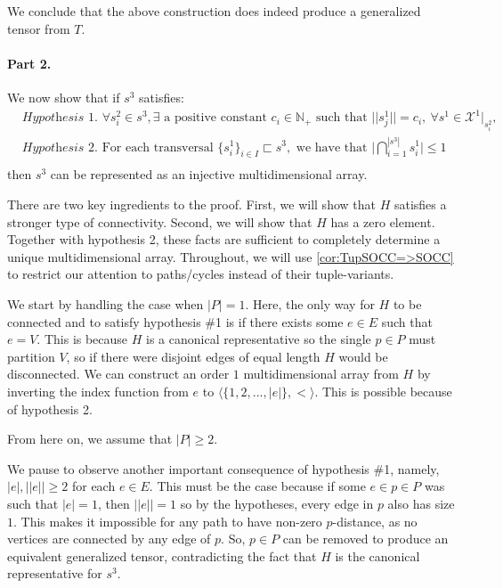 \documentclass{article}
\theoremstyle{plain}
\theoremstyle{definition}
\theoremstyle{remark}
\newcommand{\cX}{\mathcal{X}}
\let\oldparagraph\paragraph
\renewcommand{\paragraph}[1]{%
	\vspace{-0.5em}%
	\oldparagraph{#1}%
}
\begin{document}
	We conclude that the above construction does indeed produce a generalized tensor from $T$.
	
	\paragraph{Part 2.} We now show that if $s^3$ satisfies:
	\begin{equation*}
		\begin{aligned}
			&\textit{Hypothesis 1. } \forall s^2_i \in s^3, \exists \text{ a positive constant } c_i \in \mathbb{N}_+ \text{ such that } ||s^1_j|| = c_i, \ \forall s^1 \in \cX^1|_{s^2_i},\\
			&\textit{Hypothesis 2. } \text{For each transversal } \{s^1_i\}_{i\in I} \sqsubset s^3, \text{ we have that } \bigg| \bigcap_{i=1}^{|s^3|} s^1_i \bigg| \leq 1\\
		\end{aligned}
	\end{equation*}
	then $s^3$ can be represented as an injective multidimensional array.
	
	There are two key ingredients to the proof. First, we will show that $H$ satisfies a stronger type of connectivity. Second, we will show that $H$ has a zero element. Together with hypothesis 2, these facts are sufficient to completely determine a unique multidimensional array. Throughout, we will use \cref{cor:TupSOCC=>SOCC} to restrict our attention to paths/cycles instead of their tuple-variants.
	
	We start by handling the case when $|P| = 1$. Here, the only way for $H$ to be connected and to satisfy hypothesis \#1 is if there exists some $e \in E$ such that $e = V$. This is because $H$ is a canonical representative so the single $p \in P$ must partition $V$, so if there were disjoint edges of equal length $H$ would be disconnected. We can construct an order $1$ multidimensional array from $H$ by inverting the index function from $e$ to $\langle \{1,2,...,|e|\}, < \rangle$. This is possible because of hypothesis 2.
	
	From here on, we assume that $|P| \geq 2$.
	
	We pause to observe another important consequence of hypothesis \#1, namely, $|e|, ||e|| \geq 2$ for each $e \in E$. This must be the case because if some $e \in p \in P$ was such that $|e| = 1$, then $||e|| = 1$ so by the hypotheses, every edge in $p$ also has size $1$. This makes it impossible for any path to have non-zero $p$-distance, as no vertices are connected by any edge of $p$. So, $p \in P$ can be removed to produce an equivalent generalized tensor, contradicting the fact that $H$ is the canonical representative for $s^3$.
	
\end{document}
